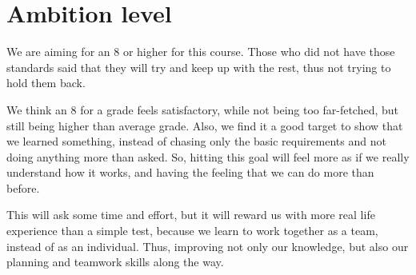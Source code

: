 \section{Ambition level}

We are aiming for an 8 or higher for this course.
Those who did not have those standards said that they will try and keep up with the rest, thus not trying to hold them back.

We think an 8 for a grade feels satisfactory, while not being too far-fetched, but still being higher than average grade.
Also, we find it a good target to show that we learned something, instead of chasing only the basic requirements and not doing anything more than asked.
So, hitting this goal will feel more as if we really understand how it works, and having the feeling that we can do more than before.

This will ask some time and effort, but it will reward us with more real life experience than a simple test, because we learn to work together as a team, instead of as an individual.
Thus, improving not only our knowledge, but also our planning and teamwork skills along the way.